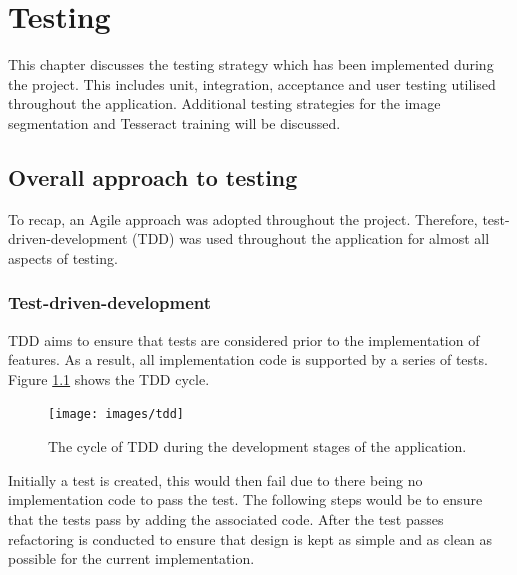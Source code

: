 \chapter{Testing}




This chapter discusses the testing strategy which has been implemented during the project. This includes unit, integration, acceptance and user testing utilised throughout the application. Additional testing strategies for the image segmentation and Tesseract training will be discussed.

\section{Overall approach to testing}
To recap, an Agile approach was adopted throughout the project. Therefore, test-driven-development (TDD) was used throughout the application for almost all aspects of testing.

\subsection{Test-driven-development}
TDD aims to ensure that tests are considered prior to the implementation of features. As a result, all implementation code is supported by a series of tests. Figure \ref{fig:tdd} shows the TDD cycle.

\begin{figure}
  \texttt{[image: images/tdd]}
  \centering
  \caption{The cycle of TDD during the development stages of the application.}
  \label{fig:tdd}
\end{figure}

Initially a test is created, this would then fail due to there being no implementation code to pass the test. The following steps would be to ensure that the tests pass by adding the associated code. After the test passes refactoring is conducted to ensure that design is kept as simple and as clean as possible for the current implementation.

